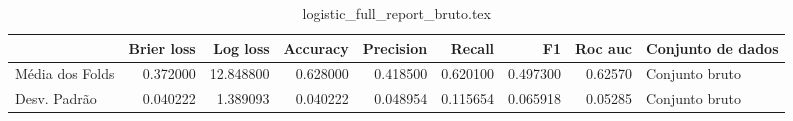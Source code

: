 \begin{table}
\centering
\caption{logistic_full_report_bruto.tex}
\label{logistic_full_report_bruto.tex}
\begin{tabular}{lrrrrrrrl}
\toprule
{} &  Brier  loss &   Log loss &  Accuracy  &  Precision  &   Recall  &       F1  &  Roc auc  & Conjunto de dados \\
\midrule
Média dos Folds &     0.372000 &  12.848800 &   0.628000 &    0.418500 &  0.620100 &  0.497300 &   0.62570 &    Conjunto bruto \\
Desv. Padrão    &     0.040222 &   1.389093 &   0.040222 &    0.048954 &  0.115654 &  0.065918 &   0.05285 &    Conjunto bruto \\
\bottomrule
\end{tabular}
\end{table}
